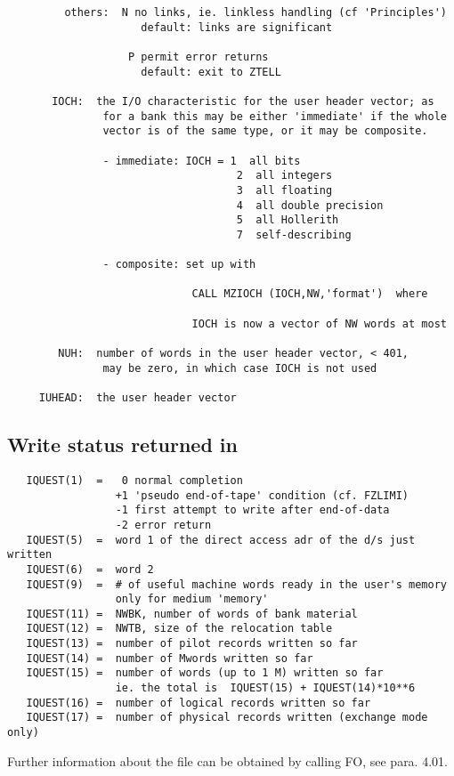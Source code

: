 \begin{verbatim}
         others:  N no links, ie. linkless handling (cf 'Principles')
                     default: links are significant

                   P permit error returns
                     default: exit to ZTELL

       IOCH:  the I/O characteristic for the user header vector; as
               for a bank this may be either 'immediate' if the whole
               vector is of the same type, or it may be composite.

               - immediate: IOCH = 1  all bits
                                    2  all integers
                                    3  all floating
                                    4  all double precision
                                    5  all Hollerith
                                    7  self-describing

               - composite: set up with

                             CALL MZIOCH (IOCH,NW,'format')  where

                             IOCH is now a vector of NW words at most

        NUH:  number of words in the user header vector, < 401,
               may be zero, in which case IOCH is not used

     IUHEAD:  the user header vector
\end{verbatim}

\subsection*{Write status returned in }

\begin{verbatim}
   IQUEST(1)  =   0 normal completion
                 +1 'pseudo end-of-tape' condition (cf. FZLIMI)
                 -1 first attempt to write after end-of-data
                 -2 error return
   IQUEST(5)  =  word 1 of the direct access adr of the d/s just written
   IQUEST(6)  =  word 2
   IQUEST(9)  =  # of useful machine words ready in the user's memory
                 only for medium 'memory'
   IQUEST(11) =  NWBK, number of words of bank material
   IQUEST(12) =  NWTB, size of the relocation table
   IQUEST(13) =  number of pilot records written so far
   IQUEST(14) =  number of Mwords written so far
   IQUEST(15) =  number of words (up to 1 M) written so far
                 ie. the total is  IQUEST(15) + IQUEST(14)*10**6
   IQUEST(16) =  number of logical records written so far
   IQUEST(17) =  number of physical records written (exchange mode only)
\end{verbatim}
   Further information about the file can be obtained
   by calling FO, see para. 4.01.

